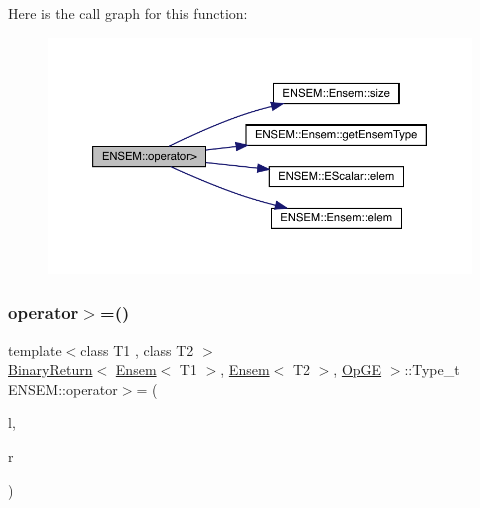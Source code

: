 Here is the call graph for this function\+:\nopagebreak
\begin{figure}[H]
\begin{center}
\leavevmode
\includegraphics[width=350pt]{d1/d9e/group__eensem_gaf81a55e62404e9b802fbb90aaee678ea_cgraph}
\end{center}
\end{figure}
\mbox{\label{group__eensem_gab4cf01cccb06cf4c911567c3ee6eb808}} 
\subsubsection{\texorpdfstring{operator$>$=()}{operator>=()}\hspace{0.1cm}{\footnotesize\ttfamily [1/3]}}
{\footnotesize\ttfamily template$<$class T1 , class T2 $>$ \\
\mbox{\hyperlink{structENSEM_1_1BinaryReturn}{Binary\+Return}}$<$ \mbox{\hyperlink{classENSEM_1_1Ensem}{Ensem}}$<$ T1 $>$, \mbox{\hyperlink{classENSEM_1_1Ensem}{Ensem}}$<$ T2 $>$, \mbox{\hyperlink{structENSEM_1_1OpGE}{Op\+GE}} $>$\+::Type\+\_\+t E\+N\+S\+E\+M\+::operator$>$= (\begin{DoxyParamCaption}\item[{const \mbox{\hyperlink{classENSEM_1_1Ensem}{Ensem}}$<$ T1 $>$ \&}]{l,  }\item[{const \mbox{\hyperlink{classENSEM_1_1Ensem}{Ensem}}$<$ T2 $>$ \&}]{r }\end{DoxyParamCaption})\hspace{0.3cm}{\ttfamily [inline]}}


